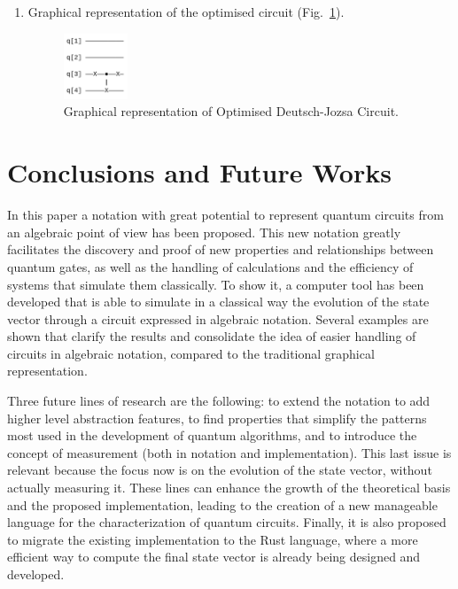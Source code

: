 \begin{enumerate}
        \item Graphical representation of the optimised circuit (Fig.~\ref{dj2_qc}).
        \begin{figure}[!ht]
            \centerline{\includegraphics[width=0.18\textwidth]{algebraic circuits/dj2_qc.png}}
            \caption{Graphical representation of Optimised Deutsch-Jozsa Circuit.}
            \label{dj2_qc}
        \end{figure}
\end{enumerate}

\section{Conclusions and Future Works}
In this paper a notation with great potential to represent quantum circuits from an algebraic point of view has been proposed. This new notation greatly facilitates the discovery and proof of new properties and relationships between quantum gates, as well as the handling of calculations and the efficiency of systems that simulate them classically. To show it, a computer tool has been developed that is able to simulate in a classical way the evolution of the state vector through a circuit expressed in algebraic notation. Several examples are shown that clarify the results and consolidate the idea of easier handling of circuits in algebraic notation, compared to the traditional graphical representation. %

Three future lines of  research are the following: to extend the notation to add higher level abstraction features, to find properties that simplify the patterns most used in the development of quantum algorithms, and to introduce the concept of measurement (both in notation and implementation).    
This last issue is relevant because the focus now is on the evolution of the state vector, without actually measuring it.  These lines can enhance the growth of the theoretical basis and the proposed implementation, leading to the creation of a new manageable language for the characterization of quantum circuits. Finally, it is also proposed to migrate the existing implementation to the Rust language, where a more efficient way to compute the final state vector is already being designed and developed.
